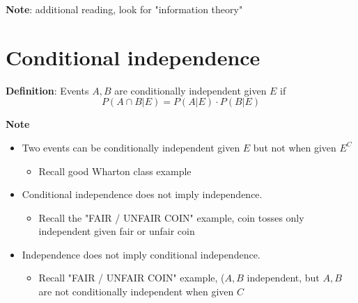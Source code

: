 \textbf{Note}: additional reading, look for "information theory"

\section{Conditional independence}
\begin{framed}
   \textbf{Definition}: Events $A, B$ are conditionally independent given  $E$ if
   \[
     P(A \cap B|E) = P(A|E) \cdot P(B|E) 
   \] 

   \textbf{Note}
   \begin{itemize}
      \item Two events can be conditionally independent given $E$ but not when given $E^C$ 
         \begin{itemize}
            \item Recall good Wharton class example
         \end{itemize}
         
       \item Conditional independence does not imply independence. 
         \begin{itemize}
            \item Recall the "FAIR / UNFAIR COIN" example, coin tosses only independent given fair or unfair coin
         \end{itemize}
       \item Independence does not imply conditional independence.
         \begin{itemize}
            \item Recall "FAIR / UNFAIR COIN" example, ($A,B$ independent, but $A, B$ are not conditionally independent when given $C$
         \end{itemize}
   \end{itemize}
\end{framed}







